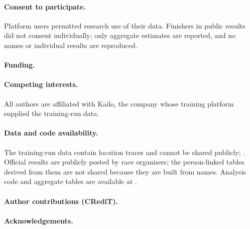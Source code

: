 \documentclass[12pt]{article}
\begin{document}
\paragraph{Consent to participate.}  Platform users permitted research use of their data. Finishers in public results did not consent individually; only aggregate estimates are reported, and no names or individual results are reproduced.

\paragraph{Funding.} 

\paragraph{Competing interests.}  All authors are affiliated with Kailo, the company whose training platform supplied the training-run data.

\paragraph{Data and code availability.} The training-run data contain location traces and cannot be shared publicly; . Official results are publicly posted by race organisers; the person-linked tables derived from them are not shared because they are built from names. Analysis code and aggregate tables are available at .

\paragraph{Author contributions (CRediT).} 

\paragraph{Acknowledgements.} 

\clearpage
\nolinenumbers
\singlespacing


\end{document}
